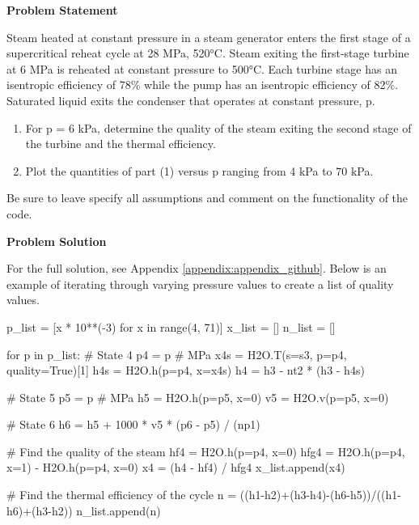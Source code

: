 \begin{tcolorbox}[breakable, enhanced jigsaw, title=ME 513: Assignment \ref{thermo_assignment_2}, 
    colframe=ksu-purple, colback=ksu-gray]

    \textbf{Problem Statement}
    \parindent15pt

    Steam heated at constant pressure in a steam generator enters the first stage of a
    supercritical reheat cycle at 28 MPa, 520°C. Steam exiting the first-stage turbine at 6 MPa is
    reheated at constant pressure to 500°C. Each turbine stage has an isentropic efficiency of 78\%
    while the pump has an isentropic efficiency of 82\%. Saturated liquid exits the condenser that
    operates at constant pressure, p.

    \begin{enumerate}
        \item For p = 6 kPa, determine the quality of the steam exiting the second stage of the 
        turbine and the thermal efficiency.
        \item Plot the quantities of part (1) versus p ranging from 4 kPa to 70 kPa.
    \end{enumerate}

    Be sure to leave specify all assumptions and comment on the functionality of the code. 

    \tcblower
    \textbf{Problem Solution}
    \parindent15pt

    For the full solution, see Appendix \ref{appendix:appendix_github}. Below is an example of 
    iterating through varying pressure values to create a list of quality values.

\begin{python}
p_list = [x * 10**(-3) for x in range(4, 71)]
x_list = []
n_list = []

for p in p_list:
    # State 4
    p4 = p # MPa
    x4s = H2O.T(s=s3, p=p4, quality=True)[1]
    h4s = H2O.h(p=p4, x=x4s)
    h4 = h3 - nt2 * (h3 - h4s)

    # State 5
    p5 = p # MPa
    h5 = H2O.h(p=p5, x=0)
    v5 = H2O.v(p=p5, x=0)

    # State 6
    h6 = h5 + 1000 * v5 * (p6 - p5) / (np1)

    # Find the quality of the steam
    hf4 = H2O.h(p=p4, x=0)
    hfg4 = H2O.h(p=p4, x=1) - H2O.h(p=p4, x=0)
    x4 = (h4 - hf4) / hfg4
    x_list.append(x4)

    # Find the thermal efficiency of the cycle
    n = ((h1-h2)+(h3-h4)-(h6-h5))/((h1-h6)+(h3-h2))
    n_list.append(n)
\end{python}


\end{tcolorbox}
